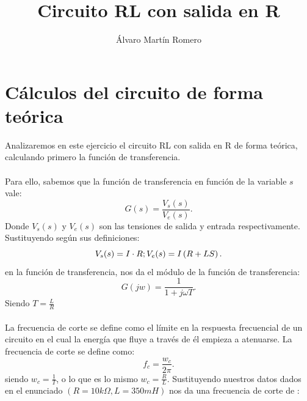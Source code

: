 \documentclass[11pt,letterpaper]{article}
\title{Circuito RL con salida en R}
\author{Álvaro Martín Romero}
\begin{document}
\maketitle
\section{Cálculos del circuito de forma teórica}%
\label{sec:Ejercicio 1}
Analizaremos en este ejercicio el circuito RL con salida en R de forma teórica, calculando primero la función de transferencia.\\
\\
Para ello, sabemos que la función de transferencia en función de la variable $s$ vale:
\[
	G(s)=\frac{V_s(s)}{V_e(s)}
.\] 
Donde $V_s(s)$ y $V_e(s)$ son las tensiones de salida y entrada respectivamente. Sustituyendo según sus definiciones:
\[
	V_s(s)=I\cdot R; \\ \\ \\ \\  \\ V_e(s)=I\left( R+LS \right) 
.\] 
en la función de transferencia, nos da el módulo de la función de transferencia:
\[
	G(jw)=\frac{1}{1+ j\omega T}
.\] 
Siendo $T=\frac{L}{R}$ \\
\\

La frecuencia de corte se define como el límite en la respuesta frecuencial de un circuito en el cual la energía que fluye a través de él empieza a atenuarse. La frecuencia de corte se define como:
\[
f_c=\frac{w_c}{2\pi}
.\] 
siendo $w_c= \frac{1}{T}$, o lo que es lo mismo $w_c=\frac{R}{L}$. Sustituyendo nuestros datos dados en el enunciado $\left( R=10 k\Omega, L=350mH \right) $ nos da una frecuencia de corte de :
\end{document}
